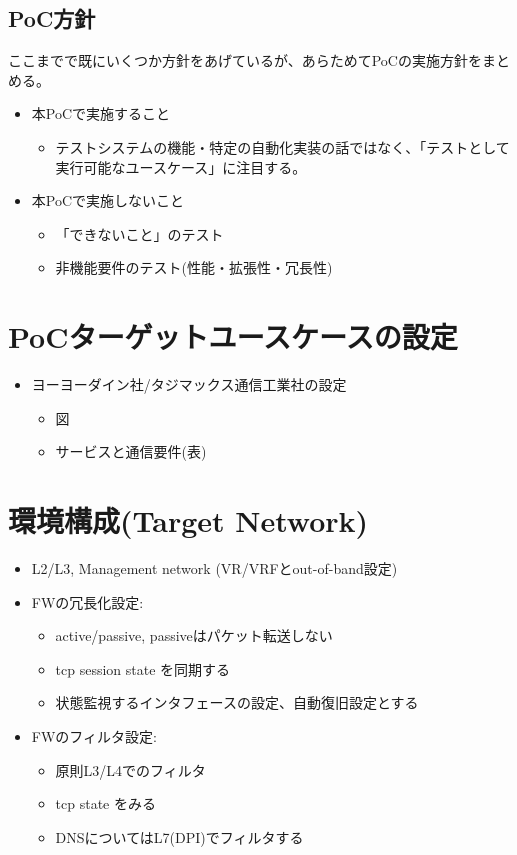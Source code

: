   \subsection{PoC方針}

ここまでで既にいくつか方針をあげているが、あらためてPoCの実施方針をまとめる。
\begin{itemize}
 \item 本PoCで実施すること
       \begin{itemize}
        \item テストシステムの機能・特定の自動化実装の話ではなく、「テストとして実行可能なユースケース」に注目する。
       \end{itemize}
 \item 本PoCで実施しないこと
       \begin{itemize}
        \item 「できないこと」のテスト
        \item 非機能要件のテスト(性能・拡張性・冗長性)
       \end{itemize}
\end{itemize}


\section{PoCターゲットユースケースの設定}

 \begin{itemize}
  \item ヨーヨーダイン社/タジマックス通信工業社の設定
        \begin{itemize}
         \item 図
         \item サービスと通信要件(表)
        \end{itemize}
 \end{itemize}

\section{環境構成(Target Network)}

\begin{itemize}
 \item L2/L3, Management network (VR/VRFとout-of-band設定)
 \item FWの冗長化設定:
       \begin{itemize}
        \item active/passive, passiveはパケット転送しない
        \item tcp session state を同期する
        \item 状態監視するインタフェースの設定、自動復旧設定とする
       \end{itemize}
 \item FWのフィルタ設定:
       \begin{itemize}
        \item 原則L3/L4でのフィルタ
        \item tcp state をみる
        \item DNSについてはL7(DPI)でフィルタする
       \end{itemize}
\end{itemize}

